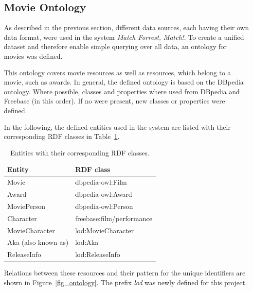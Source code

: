 \subsection{Movie Ontology}
\label{subsec_method_ontology}

As described in the previous section, different data sources, each having their own data format, were used in the system \emph{Match Forrest, Match!}.
To create a unified dataset and therefore enable simple querying over all data, an ontology for movies was defined.

This ontology covers movie resources as well as resources, which belong to a movie, such as awards.
In general, the defined ontology is based on the DBpedia ontology.
Where possible, classes and properties where used from DBpedia and Freebase (in this order).
If no were present, new classes or properties were defined.

In the following, the defined entities used in the system are listed with their corresponding RDF classes in Table~\ref{tab_entities}.

\begin{table}[ht]
	\begin{center}
	\begin{tabular}{ll}
		\textbf{Entity} & \textbf{RDF class} \\ \hline
		Movie & dbpedia-owl:Film \\
		Award & dbpedia-owl:Award \\
		MoviePerson & dbpedia-owl:Person \\
		Character & freebase:film/performance \\
		MovieCharacter & lod:MovieCharacter \\
		Aka (also known as) & lod:Aka \\
		ReleaseInfo & lod:ReleaseInfo \\
	\end{tabular}
	\end{center}
	\caption{Entities with their corresponding RDF classes.}
	\label{tab_entities}
\end{table}

Relations between these resources and their pattern for the unique identifiers are shown in Figure~\ref{fig_ontology}.
The prefix \textit{lod} was newly defined for this project.

